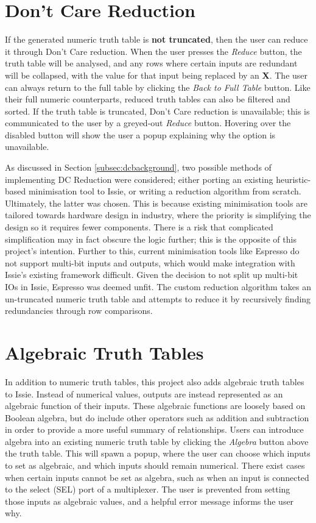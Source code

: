 \section{Don't Care Reduction}
If the generated numeric truth table is \textbf{not truncated}, then the user can reduce it through Don't Care reduction. When the user presses the \textit{Reduce} button, the truth table will be analysed, and any rows where certain inputs are redundant will be collapsed, with the value for that input being replaced by an \textbf{X}. The user can always return to the full table by clicking the \textit{Back to Full Table} button. Like their full numeric counterparts, reduced truth tables can also be filtered and sorted.
If the truth table is truncated, Don't Care reduction is unavailable; this is communicated to the user by a greyed-out \textit{Reduce} button. Hovering over the disabled button will show the user a popup explaining why the option is unavailable.

As discussed in Section \ref{subsec:dcbackground}, two possible methods of implementing DC Reduction were considered; either porting an existing heuristic-based minimisation tool to Issie, or writing a reduction algorithm from scratch. Ultimately, the latter was chosen. This is because existing minimisation tools are tailored towards hardware design in industry, where the priority is simplifying the design so it requires fewer components. There is a risk that complicated simplification may in fact obscure the logic further; this is the opposite of this project's intention. Further to this, current minimisation tools like Espresso \cite{espresso} do not support multi-bit inputs and outputs, which would make integration with Issie's existing framework difficult. Given the decision to not split up multi-bit IOs in Issie, Espresso was deemed unfit. The custom reduction algorithm takes an un-truncated numeric truth table and attempts to reduce it by recursively finding redundancies through row comparisons.

\section{Algebraic Truth Tables}
In addition to numeric truth tables, this project also adds algebraic truth tables to Issie. Instead of numerical values, outputs are instead represented as an algebraic function of their inputs. These algebraic functions are loosely based on Boolean algebra, but do include other operators such as addition and subtraction in order to provide a more useful summary of relationships. Users can introduce algebra into an existing numeric truth table by clicking the \textit{Algebra} button above the truth table. This will spawn a popup, where the user can choose which inputs to set as algebraic, and which inputs should remain numerical. There exist cases when certain inputs cannot be set as algebra, such as when an input is connected to the select (SEL) port of a multiplexer. The user is prevented from setting those inputs as algebraic values, and a helpful error message informs the user why.


